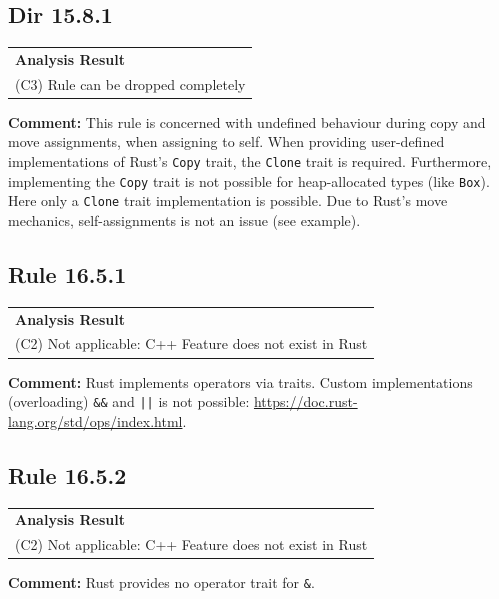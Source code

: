 \subsection*{Dir 15.8.1}
\begin{longtable}{p{13cm}}
\textbf{Analysis Result} \\
(C3) Rule can be dropped completely \\
\end{longtable}
\textbf{Comment:} This rule is concerned with undefined behaviour during copy and move assignments, when assigning to self. When providing user-defined implementations of Rust's \texttt{Copy} trait, the \texttt{Clone} trait is required. Furthermore, implementing the \texttt{Copy} trait is not possible for heap-allocated types (like \texttt{Box}). Here only a \texttt{Clone} trait implementation is possible. Due to Rust's move mechanics, self-assignments is not an issue (see example). \\


\subsection*{Rule 16.5.1}
\begin{longtable}{p{13cm}}
\textbf{Analysis Result} \\
(C2) Not applicable: C++ Feature does not exist in Rust \\
\end{longtable}
\textbf{Comment:} Rust implements operators via traits. Custom implementations (overloading) \texttt{\&\&} and \texttt{||} is not possible: \url{https://doc.rust-lang.org/std/ops/index.html}. \\
\subsection*{Rule 16.5.2}
\begin{longtable}{p{13cm}}
\textbf{Analysis Result} \\
(C2) Not applicable: C++ Feature does not exist in Rust \\
\end{longtable}
\textbf{Comment:} Rust provides no operator trait for \texttt{\&}. \\
